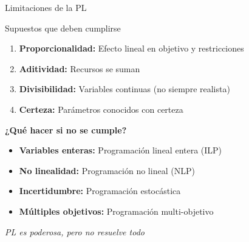 \documentclass[aspectratio=169,10pt]{beamer}
\begin{document}
\begin{frame}{Limitaciones de la PL}

\begin{alertblock}{Supuestos que deben cumplirse}
\begin{enumerate}
    \item \textbf{Proporcionalidad:} Efecto lineal en objetivo y restricciones
    \item \textbf{Aditividad:} Recursos se suman
    \item \textbf{Divisibilidad:} Variables continuas (no siempre realista)
    \item \textbf{Certeza:} Parámetros conocidos con certeza
\end{enumerate}
\end{alertblock}

\vspace{0.3cm}

\textbf{¿Qué hacer si no se cumple?}

\begin{itemize}
    \item \textbf{Variables enteras:} Programación lineal entera (ILP)
    \item \textbf{No linealidad:} Programación no lineal (NLP)
    \item \textbf{Incertidumbre:} Programación estocástica
    \item \textbf{Múltiples objetivos:} Programación multi-objetivo
\end{itemize}

\vspace{0.3cm}

\begin{center}
\textit{PL es poderosa, pero no resuelve todo}
\end{center}

\end{frame}
\end{document}
